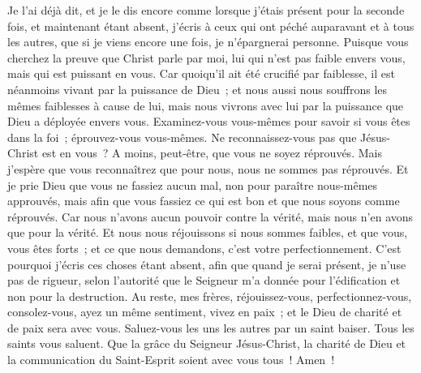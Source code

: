 \begin{multicols}{2}
Je l'ai déjà dit, et je le dis encore comme lorsque j'étais présent pour la seconde fois, et maintenant étant absent, j'écris à ceux qui ont péché auparavant et à tous les autres, que si je viens encore une fois, je n'épargnerai personne.
Puisque vous cherchez la preuve que Christ parle par moi, lui qui n'est pas faible envers vous, mais qui est puissant en vous.
Car quoiqu'il ait été crucifié par faiblesse, il est néanmoins vivant par la puissance de Dieu~; et nous aussi nous souffrons les mêmes faiblesses à cause de lui, mais nous vivrons avec lui par la puissance que Dieu a déployée envers vous.
Examinez-vous vous-mêmes pour savoir si vous êtes dans la foi~; éprouvez-vous vous-mêmes. Ne reconnaissez-vous pas que Jésus-Christ est en vous~? A moins, peut-être, que vous ne soyez réprouvés.
Mais j'espère que vous reconnaîtrez que pour nous, nous ne sommes pas réprouvés.
Et je prie Dieu que vous ne fassiez aucun mal, non pour paraître nous-mêmes approuvés, mais afin que vous fassiez ce qui est bon et que nous soyons comme réprouvés.
Car nous n'avons aucun pouvoir contre la vérité, mais nous n'en avons que pour la vérité.
Et nous nous réjouissons si nous sommes faibles, et que vous, vous êtes forts~; et ce que nous demandons, c'est votre perfectionnement.
C'est pourquoi j'écris ces choses étant absent, afin que quand je serai présent, je n'use pas de rigueur, selon l'autorité que le Seigneur m'a donnée pour l'édification et non pour la destruction.
Au reste, mes frères, réjouissez-vous, perfectionnez-vous, consolez-vous, ayez un même sentiment, vivez en paix~; et le Dieu de charité et de paix sera avec vous.
Saluez-vous les uns les autres par un saint baiser. Tous les saints vous saluent.
Que la grâce du Seigneur Jésus-Christ, la charité de Dieu et la communication du Saint-Esprit soient avec vous tous~! Amen~!
\PPE{}
\end{multicols}
